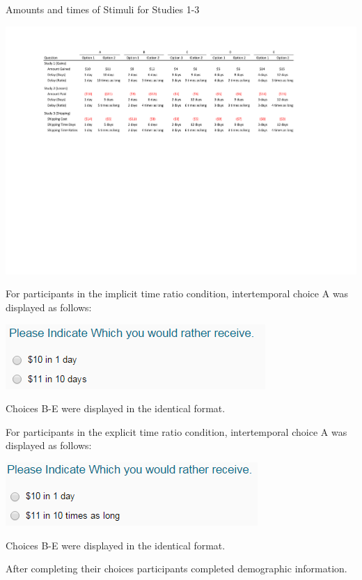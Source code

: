 \documentclass[]{article}
\begin{document}
\begin{landscape}
\begin{table}[!ht]
	\caption{Amounts and times of Stimuli for Studies 1-3} 
	\label{tab:stimuli}
	\includegraphics[]{Stimuli_For_Study.pdf}
\end{table}
\end{landscape}

For participants in the implicit time ratio condition, intertemporal choice A was displayed as follows: 

\includegraphics[]{study1_implicit}

Choices B-E were displayed in the identical format. 

For participants in the explicit time ratio condition, intertemporal choice A was displayed as follows:

\includegraphics[]{study1_explicit}

Choices B-E were displayed in the identical format. 


After completing their choices participants completed demographic information.
\end{document}
